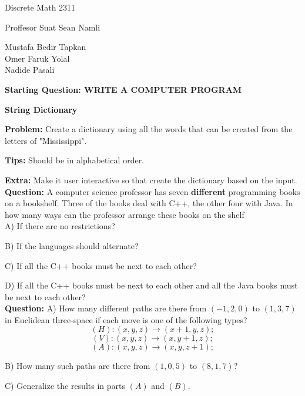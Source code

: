 \documentclass[11pt]{article}
\begin{document}
\begin{center}
Discrete Math 2311
\end{center}

\begin{center}
Proffesor Suat Sean Namli\\
\end{center}

\begin{center}
Mustafa Bedir Tapkan\\
Omer Faruk Yolal\\
Nadide Pasali\\
\end{center}

\newpage

\textbf{Starting Question: WRITE A COMPUTER PROGRAM} 

\textbf{String Dictionary}

\textbf{Problem:} Create a dictionary using all the words that can be created from the letters of "Mississippi".

\textbf{Tips:} Should be in alphabetical order.

\textbf{Extra:} Make it user interactive so that create the dictionary based on the input.
\\

\textbf{Question:}  A computer science professor has seven \textbf{different} programming books on a bookshelf. Three of the books deal with C++, the other four with Java. In how many ways can the professor arrange these books on the shelf\\

A) If there are no restrictions?

B) If the languages should alternate?

C) If all the C++ books must be next to each other?

D) If all the C++ books must be next to each other and all the Java books must be next to each other?
\\

\textbf{Question:}  A) How many different paths are there from $(-1,2,0)$ to $(1,3,7)$ in Euclidean three-space if each move is one of the following types?
$$(H):(x,y,z)\rightarrow(x+1,y,z);$$
$$(V):(x,y,z)\rightarrow(x,y+1,z);$$
$$(A):(x,y,z)\rightarrow(x,y,z+1);$$

B) How many such paths are there from $(1,0,5)$ to $(8,1,7)$?

C) Generalize the results in parts $(A)$ and $(B)$.
\\
\end{document}
